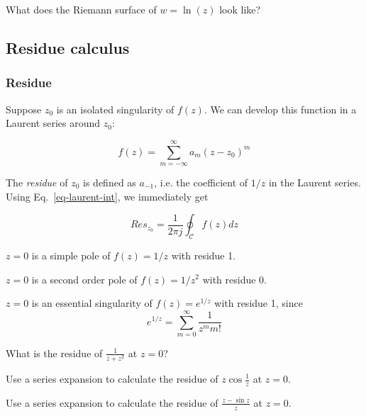 \begin{sidebar}
\begin{ex}
What does the Riemann surface of $w=\ln(z)$ look like?
\end{ex}
\end{sidebar}

\subsection{Residue calculus}

\subsubsection*{Residue}

Suppose $z_0$ is an isolated singularity of $f(z)$. We can develop this function
in a Laurent series around $z_0$:

\begin{equation}
f(z)= \sum_{m=-\infty}^{\infty} a_m (z-z_0)^m
\end{equation} 

The \emph{residue} of $z_0$ is defined as $a_{-1}$, i.e. the coefficient of
$1/z$ in the Laurent series. Using Eq.~\ref{eq-laurent-int}, we immediately get

\begin{equation}
Res_{z_0}=\frac{1}{2 \pi j }  \oint_{\mathcal{C}} f(z) dz \label{eq-res-int}
\end{equation} 

\begin{sidebar}
\begin{exa}
$z=0$ is a simple pole of $f(z)=1/z$ with residue 1.
\end{exa}

\begin{exa}
$z=0$ is a second order pole of $f(z)=1/z^2$ with residue 0.
\end{exa}

\begin{exa}
$z=0$ is an essential singularity of $f(z)=e^{1/z}$ with residue 1, since
$$e^{1/z} = \sum_{m=0}^{\infty} \frac{1}{z^m m!} $$
\end{exa}
\end{sidebar}

\begin{sidebar}
\begin{ex}
What is the residue of $\frac{1}{z+z^2}$ at $z=0$?
\end{ex}

\begin{ex}
Use a series expansion to calculate the residue of $z \cos \frac{1}{z}$ at $z=0$.
\end{ex}

\begin{ex}
Use a series expansion to calculate the residue of $\frac{z - \sin z}{z}$ at $z=0$.
\end{ex}
\end{sidebar}

